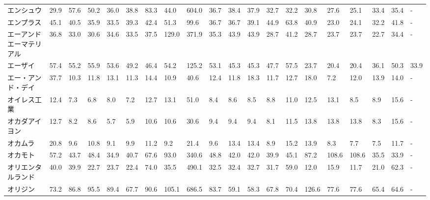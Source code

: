 \begin{tabular}{llllllllllllllllllll}
エンシュウ           &   29.9 &   57.6 &      50.2 &      36.0 &       38.8 &    83.3 &    44.0 &    604.0 &    36.7 &    38.4 &   37.9 &   32.7 &    32.2 &    30.8 &    27.6 &   25.1 &   33.4 &    35.4 &      - \\
エンプラス           &   45.1 &   40.5 &      35.9 &      33.5 &       39.3 &    42.4 &    51.3 &     99.6 &    36.7 &    36.7 &   39.1 &   44.9 &    63.8 &    40.9 &    23.0 &   24.1 &   32.2 &    41.8 &      - \\
エーアンドエーマテリアル    &   36.8 &   33.0 &      30.6 &      34.6 &       33.5 &    37.5 &   129.0 &    371.9 &    35.3 &    43.9 &   43.9 &   28.7 &    41.2 &    28.7 &    23.7 &   23.7 &   22.7 &    34.4 &      - \\
エーザイ            &   57.4 &   55.2 &      55.9 &      53.6 &       49.2 &    46.4 &    54.2 &    125.2 &    53.1 &    45.3 &   45.3 &   47.7 &    57.5 &    23.7 &    20.4 &   20.4 &   36.1 &    50.3 &   33.9 \\
エー・アンド・デイ       &   37.7 &   10.3 &      11.8 &      13.1 &       11.3 &    14.4 &    10.9 &     40.6 &    12.4 &    11.8 &   18.3 &   11.7 &    12.7 &    18.0 &     7.2 &   12.0 &   13.9 &    14.0 &      - \\
オイレス工業          &   12.4 &    7.3 &       6.8 &       8.0 &        7.2 &    12.7 &    13.1 &     51.0 &     8.4 &     8.6 &    8.5 &    8.8 &    11.0 &    12.5 &    13.1 &    8.5 &    8.9 &    15.6 &      - \\
オカダアイヨン         &   12.7 &    8.2 &       8.6 &       5.7 &        5.9 &    10.6 &    10.6 &     30.6 &     9.4 &     9.4 &    9.4 &    8.1 &    11.5 &    13.8 &    13.8 &   13.8 &    8.3 &    15.6 &      - \\
オカムラ            &   20.8 &    9.6 &      10.8 &       9.1 &        9.9 &    11.2 &     9.2 &     21.4 &     9.6 &    13.4 &   13.4 &    8.9 &    15.2 &    13.9 &     8.3 &    7.7 &    7.5 &    11.7 &      - \\
オカモト            &   57.2 &   43.7 &      48.4 &      34.9 &       40.7 &    67.6 &    93.0 &    340.6 &    48.8 &    42.0 &   42.0 &   39.9 &    45.1 &    87.2 &   108.6 &  108.6 &   35.5 &    33.9 &      - \\
オリエンタルランド       &   40.0 &   39.9 &      22.7 &      23.7 &       22.4 &    74.0 &    35.5 &    490.1 &    32.5 &    32.4 &   32.7 &   31.7 &    59.0 &    12.0 &    15.9 &   11.7 &   21.0 &    62.3 &      - \\
オリジン            &   73.2 &   86.8 &      95.5 &      89.4 &       67.7 &    90.6 &   105.1 &    686.5 &    83.7 &    59.1 &   58.3 &   67.8 &    70.4 &   126.6 &    77.6 &   77.6 &   65.4 &    64.6 &      - \\

\end{tabular}
